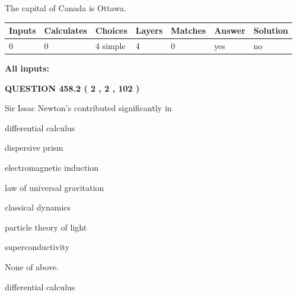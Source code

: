 \documentclass[12pt]{article}
\begin{document}
 
The capital of Canada is Ottawa.
 
 
\noindent{}
 
 
   
   
   
   
\noindent\begin{tabular}{|l|l|l|l|l|l|l|}
 \hline
Inputs & Calculates & Choices & Layers & Matches & Answer & Solution \\ \hline
 0  & 
 0  & 
 4
  simple  
  & 
 4  & 
 0  & 
  yes & 
  no 
  \\ \hline
 \end{tabular}
   
   
   
   
\noindent{}
   
   
   
   
\noindent\vspace{0.1in}\hspace{-0.08in} {\textbf{\Large{All inputs: }}}
   
   
  
\vspace{0.2in}
  
{\textbf{\Large{QUESTION
458.2 
 ( 2 , 2 , 102 )
}}}
  
  
Sir Issac Newton's contributed significantly in
 
 
differential calculus
 
 
dispersive prism
 
 
electromagnetic induction
 
 
law of universal gravitation
 
 
classical dynamics
 
 
particle theory of light
 
 
superconductivity
 
 
 None of above.
 
 
\noindent{}
 
 
differential calculus
 
\end{document}
